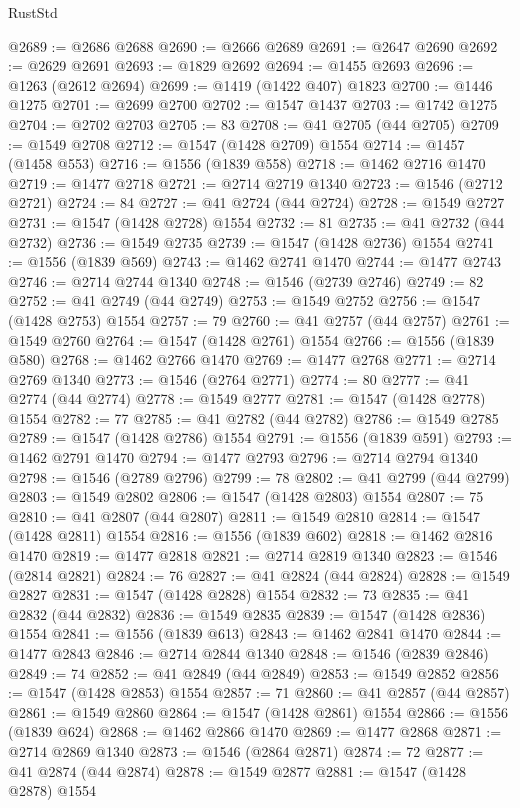 \begin{lexlean}{RustStd}
\begin{coremodule}
@2689 := @2686 @2688
@2690 := @2666 @2689
@2691 := @2647 @2690
@2692 := @2629 @2691
@2693 := @1829 @2692
@2694 := @1455 @2693
@2696 := @1263 (@2612 @2694)
@2699 := @1419 (@1422 @407) @1823
@2700 := @1446 @1275
@2701 := @2699 @2700
@2702 := @1547 @1437
@2703 := @1742 @1275
@2704 := @2702 @2703
@2705 := 83
@2708 := @41 @2705 (@44 @2705)
@2709 := @1549 @2708
@2712 := @1547 (@1428 @2709) @1554
@2714 := @1457 (@1458 @553)
@2716 := @1556 (@1839 @558)
@2718 := @1462 @2716 @1470
@2719 := @1477 @2718
@2721 := @2714 @2719 @1340
@2723 := @1546 (@2712 @2721)
@2724 := 84
@2727 := @41 @2724 (@44 @2724)
@2728 := @1549 @2727
@2731 := @1547 (@1428 @2728) @1554
@2732 := 81
@2735 := @41 @2732 (@44 @2732)
@2736 := @1549 @2735
@2739 := @1547 (@1428 @2736) @1554
@2741 := @1556 (@1839 @569)
@2743 := @1462 @2741 @1470
@2744 := @1477 @2743
@2746 := @2714 @2744 @1340
@2748 := @1546 (@2739 @2746)
@2749 := 82
@2752 := @41 @2749 (@44 @2749)
@2753 := @1549 @2752
@2756 := @1547 (@1428 @2753) @1554
@2757 := 79
@2760 := @41 @2757 (@44 @2757)
@2761 := @1549 @2760
@2764 := @1547 (@1428 @2761) @1554
@2766 := @1556 (@1839 @580)
@2768 := @1462 @2766 @1470
@2769 := @1477 @2768
@2771 := @2714 @2769 @1340
@2773 := @1546 (@2764 @2771)
@2774 := 80
@2777 := @41 @2774 (@44 @2774)
@2778 := @1549 @2777
@2781 := @1547 (@1428 @2778) @1554
@2782 := 77
@2785 := @41 @2782 (@44 @2782)
@2786 := @1549 @2785
@2789 := @1547 (@1428 @2786) @1554
@2791 := @1556 (@1839 @591)
@2793 := @1462 @2791 @1470
@2794 := @1477 @2793
@2796 := @2714 @2794 @1340
@2798 := @1546 (@2789 @2796)
@2799 := 78
@2802 := @41 @2799 (@44 @2799)
@2803 := @1549 @2802
@2806 := @1547 (@1428 @2803) @1554
@2807 := 75
@2810 := @41 @2807 (@44 @2807)
@2811 := @1549 @2810
@2814 := @1547 (@1428 @2811) @1554
@2816 := @1556 (@1839 @602)
@2818 := @1462 @2816 @1470
@2819 := @1477 @2818
@2821 := @2714 @2819 @1340
@2823 := @1546 (@2814 @2821)
@2824 := 76
@2827 := @41 @2824 (@44 @2824)
@2828 := @1549 @2827
@2831 := @1547 (@1428 @2828) @1554
@2832 := 73
@2835 := @41 @2832 (@44 @2832)
@2836 := @1549 @2835
@2839 := @1547 (@1428 @2836) @1554
@2841 := @1556 (@1839 @613)
@2843 := @1462 @2841 @1470
@2844 := @1477 @2843
@2846 := @2714 @2844 @1340
@2848 := @1546 (@2839 @2846)
@2849 := 74
@2852 := @41 @2849 (@44 @2849)
@2853 := @1549 @2852
@2856 := @1547 (@1428 @2853) @1554
@2857 := 71
@2860 := @41 @2857 (@44 @2857)
@2861 := @1549 @2860
@2864 := @1547 (@1428 @2861) @1554
@2866 := @1556 (@1839 @624)
@2868 := @1462 @2866 @1470
@2869 := @1477 @2868
@2871 := @2714 @2869 @1340
@2873 := @1546 (@2864 @2871)
@2874 := 72
@2877 := @41 @2874 (@44 @2874)
@2878 := @1549 @2877
@2881 := @1547 (@1428 @2878) @1554

\end{coremodule}
\end{lexlean}
